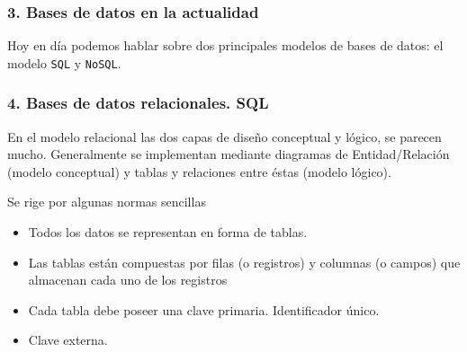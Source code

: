 \documentclass{beamer}
\begin{document}
	

\begin{frame}

	\frametitle{3. Bases de datos en la actualidad}
	
	Hoy en día podemos hablar sobre dos principales modelos de bases de datos: el modelo \texttt{SQL} y \texttt{NoSQL}.
	
	

\end{frame}



\begin{frame}

	\frametitle{4. Bases de datos relacionales. SQL}
	
	\begin{block}{}
		En el modelo relacional las dos capas de diseño conceptual y lógico, se parecen mucho.
		Generalmente se implementan mediante diagramas de Entidad/Relación (modelo
		conceptual) y tablas y relaciones entre éstas (modelo lógico).
	\end{block}
	
	Se rige por algunas normas sencillas
	\begin{itemize}[<+-| alert@+>]
		\item Todos los datos se representan en forma de tablas.
		\item Las tablas están compuestas por filas (o registros) y columnas (o campos) que almacenan cada uno de los registros
		\item Cada tabla debe poseer una clave primaria. Identificador único.
		\item Clave externa.
	\end{itemize}
	
\end{frame}
\end{document}
